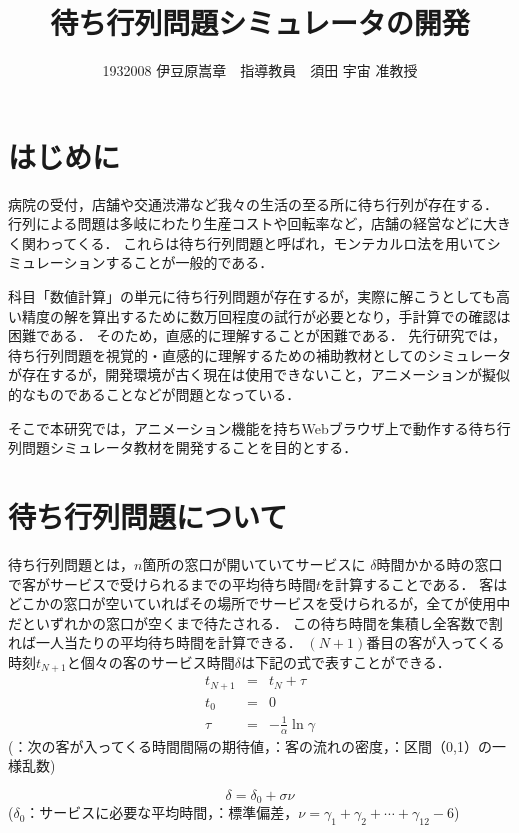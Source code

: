 \documentclass[twocolumn,10pt,a4j]{ltjsarticle}
\title{待ち行列問題シミュレータの開発}
\author{1932008 伊豆原嵩章　指導教員　須田 宇宙 准教授}
\date{}
\begin{document}
\maketitle

\section{はじめに}
病院の受付，店舗や交通渋滞など我々の生活の至る所に待ち行列が存在する．
行列による問題は多岐にわたり生産コストや回転率など，店舗の経営などに大きく関わってくる．
これらは待ち行列問題と呼ばれ，モンテカルロ法を用いてシミュレーションすることが一般的である．

科目「数値計算」の単元に待ち行列問題が存在するが，実際に解こうとしても高い精度の解を算出するために数万回程度の試行が必要となり，手計算での確認は困難である．
そのため，直感的に理解することが困難である．
先行研究では，待ち行列問題を視覚的・直感的に理解するための補助教材としてのシミュレータが存在するが，開発環境が古く現在は使用できないこと，アニメーションが擬似的なものであることなどが問題となっている\cite{past}．

そこで本研究では，アニメーション機能を持ちWebブラウザ上で動作する待ち行列問題シミュレータ教材を開発することを目的とする．


\section{待ち行列問題について}
待ち行列問題とは，$n$箇所の窓口が開いていてサービスに $\delta$時間かかる時の窓口で客がサービスで受けられるまでの平均待ち時間$t$を計算することである．
客はどこかの窓口が空いていればその場所でサービスを受けられるが，全てが使用中だといずれかの窓口が空くまで待たされる．
この待ち時間を集積し全客数で割れば一人当たりの平均待ち時間を計算できる．
$(N+1)$番目の客が入ってくる時刻$t_{N+1}$と個々の客のサービス時間$\delta$は下記の式で表すことができる\cite{text}．
\begin{eqnarray}
t_{N+1} & = & t_N+\tau\\
t_0 & = & 0\\
\tau & = & -\frac{1}{\alpha}\ln\gamma
\end{eqnarray}
(\tau：次の客が入ってくる時間間隔の期待値，\alpha：客の流れの密度，\gamma：区間（0,1）の一様乱数)

\begin{equation}
\delta=\delta_0+\sigma\nu
\end{equation}
\vspace{-1mm}
($\delta_0$：サービスに必要な平均時間，\sigma：標準偏差，$\nu=\gamma_1+\gamma_2+\cdots+\gamma_{12}-6$)
\end{document}
